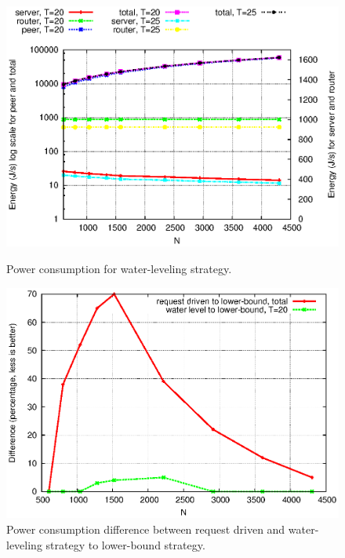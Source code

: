 \documentclass[conference]{IEEEtran}
\begin{document}
\begin{figure}[htp!]
\begin{minipage}[b]{0.4\linewidth}
	\includegraphics[scale=0.45]{graphs/wl-energy.eps}
	\caption{Power consumption for water-leveling strategy.}
	\label{fig:wl-energy}
\end{minipage}
\hfill
\centering
\begin{minipage}[b]{0.4\linewidth}
	\includegraphics[scale=0.45]{graphs/diff-12.eps}
	\caption{Power consumption difference between request driven and water-leveling strategy to lower-bound strategy.}
	\label{fig:diff-12}
\end{minipage}
\label{fig:powereachstrategy}
\end{figure}
\end{document}
